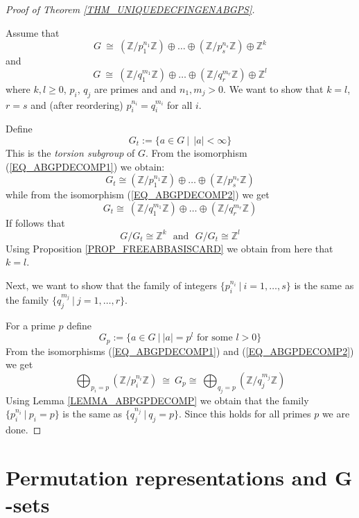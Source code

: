 \documentclass[12pt, letterpaper, oneside]{article}
\theoremstyle{plain}
\theoremstyle{definition}
\newcommand{\Z}{{\mathbb Z}}
\begin{document}
\begin{proof}[Proof of Theorem \ref{THM_UNIQUEDECFINGENABGPS}]\ 

\vskip -3mm


Assume that 
\begin{equation}
\label{EQ_ABGPDECOMP1}
G\ \cong \ (\Z/p_{1}^{n_{1}}\Z)  \oplus  {\dots} \oplus  (\Z/p_{s}^{n_{s}}\Z)  \oplus  \Z^{k}
\end{equation}
and 
\begin{equation}
\label{EQ_ABGPDECOMP2}
G\ \cong \ (\Z/q_{1}^{m_{1}}\Z)  \oplus  {\dots} \oplus  (\Z/q_{r}^{m_{r}}\Z)  \oplus  \Z^{l}
\end{equation}
where $k, l\geq 0$, $p_{i}$, $q_{j}$ are primes and  and $n_{1}, m_{j} >0$.
We want to show that  $k = l$, $r=s$ and (after reordering) $p_{i}^{n_{i}}=q_{i}^{m_{i}}$ for all $i$. 

Define  
$$G_{t} := \{ a\in G \ | \ \ |a| < \infty \}$$
This is the \emph{torsion subgroup} of $G$. From the isomorphism (\ref{EQ_ABGPDECOMP1})
we obtain:
$$G_{t}\cong  (\Z/p_{1}^{n_{1}}\Z)  \oplus  {\dots} \oplus  (\Z/p_{s}^{n_{s}}\Z)$$
while from the isomorphism (\ref{EQ_ABGPDECOMP2}) we get 
$$G_{t} \cong \ (\Z/q_{1}^{m_{1}}\Z)  \oplus  {\dots} \oplus  (\Z/q_{r}^{m_{r}}\Z) $$
If follows that 
$$G/G_{t} \cong \Z^{k} \ \ \ \text{and} \ \ \ G/G_{t} \cong \Z^{l}$$
Using  Proposition \ref{PROP_FREEABBASISCARD} we obtain from here   that $k=l$.


Next, we want to show that the family of integers $\{p_{i}^{n_{i}} \ | \ i = 1, \dots, s \}$
is the same as the family $\{ q_{j}^{m_{j}} \ | \ j = 1, \dots, r \}$.

For a prime $p$  define
$$G_{p} := \{ a\in G \  |\   |a| = p^{l} \text{ for some } l > 0  \}$$
From the isomorphisms (\ref{EQ_ABGPDECOMP1})  and (\ref{EQ_ABGPDECOMP2}) we get 
$$\bigoplus_{p_{i} = p} (\Z/p_{i}^{n_{i}}\Z) \ \cong \ G_{p} \cong \   \bigoplus_{q_{j} = p} (\Z/q_{j}^{m_{j}}\Z)$$
Using  Lemma \ref{LEMMA_ABPGPDECOMP} we obtain that the family 
$\{p_{i}^{n_{i}} \ | \ p_{i} = p\}$ is the same as $\{q_{j}^{n_{j}} \ | \ q_{j} = p \}$. 
Since this holds for all primes $p$ we are done. 

\end{proof}






\newpage
\section{Permutation representations and $\mathbf G$-sets}
\label{SEC_PERMREPS}
\end{document}
